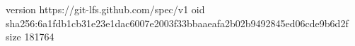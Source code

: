 version https://git-lfs.github.com/spec/v1
oid sha256:6a1fdb1cb31e23e1dac6007e2003f33bbaaeafa2b02b9492845ed06cde9b6d2f
size 181764

